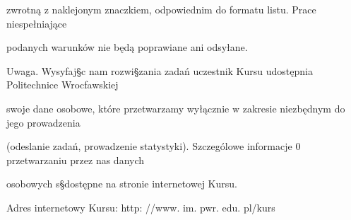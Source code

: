 \documentclass[a4paper,12pt]{article}
\begin{document}
zwrotną $\mathrm{z}$ naklejonym znaczkiem, odpowiednim do formatu listu. Prace niespełniające

podanych warunków nie będą poprawiane ani odsyłane.

Uwaga. Wysyfaj\S c nam rozwi\S zania zadań uczestnik Kursu udostępnia Politechnice Wrocfawskiej

swoje dane osobowe, które przetwarzamy wyłącznie $\mathrm{w}$ zakresie niezbędnym do jego prowadzenia

(odeslanie zadań, prowadzenie statystyki). Szczególowe informacje $0$ przetwarzaniu przez nas danych

osobowych s\S dostępne na stronie internetowej Kursu.

Adres internetowy Kursu: http: //www. im. pwr. edu. pl/kurs
\end{document}
